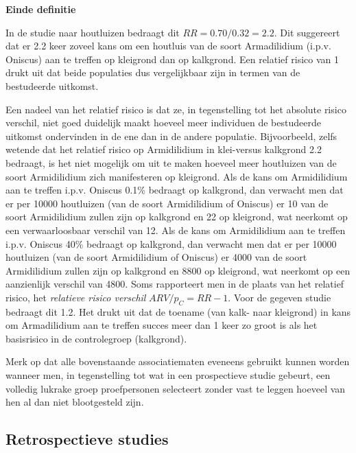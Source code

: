 \documentclass[
  12pt,dutch,coursenotes]{book}
\theoremstyle{definition}
\theoremstyle{definition}
\theoremstyle{definition}
\theoremstyle{definition}
\theoremstyle{remark}
\begin{document}
\textbf{Einde definitie}

In de studie naar houtluizen bedraagt dit \(RR=0.70/0.32=2.2\). Dit
suggereert dat er 2.2 keer zoveel kans om een houtluis van de soort Armadilidium (i.p.v. Oniscus) aan te treffen op kleigrond dan op kalkgrond. Een
relatief risico van 1 drukt uit dat beide populaties dus vergelijkbaar zijn in termen van de bestudeerde uitkomst.

Een nadeel van het relatief risico is dat ze, in tegenstelling tot het absolute risico verschil, niet goed duidelijk maakt hoeveel meer individuen de bestudeerde uitkomst ondervinden in de ene dan in de andere populatie. Bijvoorbeeld, zelfs wetende dat het relatief risico op Armidilidium in klei-versus kalkgrond 2.2 bedraagt, is het niet mogelijk om uit te maken hoeveel meer houtluizen van de soort Armidilidium zich manifesteren op kleigrond. Als de kans om Armidilidium aan te treffen i.p.v. Oniscus 0.1\% bedraagt op kalkgrond, dan verwacht men dat er per 10000 houtluizen (van de soort Armidilidium of Oniscus) er 10 van de soort Armidilidium zullen zijn op kalkgrond en 22 op kleigrond, wat neerkomt op een verwaarloosbaar verschil van 12. Als de kans om Armidilidium aan te treffen i.p.v. Oniscus 40\% bedraagt op kalkgrond, dan verwacht men dat er per 10000 houtluizen (van de soort Armidilidium of Oniscus) er 4000 van de soort Armidilidium zullen zijn op kalkgrond en 8800 op kleigrond, wat neerkomt op een aanzienlijk verschil van 4800. Soms rapporteert men in de plaats van het relatief risico, het
\emph{relatieve risico verschil} \(ARV/p_C=RR-1\). Voor de gegeven studie
bedraagt dit 1.2. Het drukt uit dat de toename (van kalk- naar kleigrond) in kans om Armadilidium aan te treffen succes meer dan 1 keer zo groot is als het basisrisico in de controlegroep (kalkgrond).

Merk op dat alle bovenstaande associatiematen eveneens gebruikt kunnen
worden wanneer men, in tegenstelling tot wat in een prospectieve studie
gebeurt, een volledig lukrake groep proefpersonen selecteert zonder vast te
leggen hoeveel van hen al dan niet blootgesteld zijn.

\hypertarget{subsec:retrospect}{%
\subsection{Retrospectieve studies}\label{subsec:retrospect}}
\end{document}
